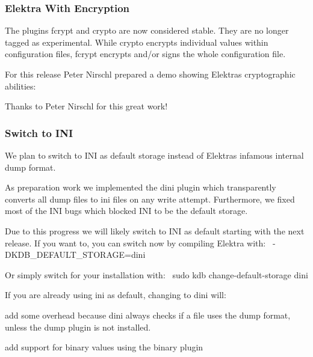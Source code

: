 \subsubsection*{Elektra With Encryption}

The plugins {\ttfamily fcrypt} and {\ttfamily crypto} are now considered stable. They are no longer tagged as {\ttfamily experimental}. While {\ttfamily crypto} encrypts individual values within configuration files, {\ttfamily fcrypt} encrypts and/or signs the whole configuration file.

For this release Peter Nirschl prepared a demo showing Elektra\textquotesingle{}s cryptographic abilities\+:

\href{https://asciinema.org/a/153014}{\tt }

Thanks to Peter Nirschl for this great work!

\subsubsection*{Switch to I\+NI}

We plan to switch to I\+NI as default storage instead of Elektra\textquotesingle{}s infamous internal dump format.

As preparation work we implemented the {\ttfamily dini} plugin which transparently converts all {\ttfamily dump} files to {\ttfamily ini} files on any write attempt. Furthermore, we fixed most of the I\+NI bugs which blocked I\+NI to be the default storage.

Due to this progress we will likely switch to I\+NI as default starting with the next release. If you want to, you can switch now by compiling Elektra with\+:~\newline
 {\ttfamily -\/\+D\+K\+D\+B\+\_\+\+D\+E\+F\+A\+U\+L\+T\+\_\+\+S\+T\+O\+R\+A\+GE=dini}

Or simply switch for your installation with\+:~\newline
 {\ttfamily sudo kdb change-\/default-\/storage dini}

If you are already using {\ttfamily ini} as default, changing to {\ttfamily dini} will\+:


\begin{DoxyItemize}
\item add some overhead because {\ttfamily dini} always checks if a file uses the {\ttfamily dump} format, unless the {\ttfamily dump} plugin is not installed.
\item add support for binary values using the {\ttfamily binary} plugin
\end{DoxyItemize}

